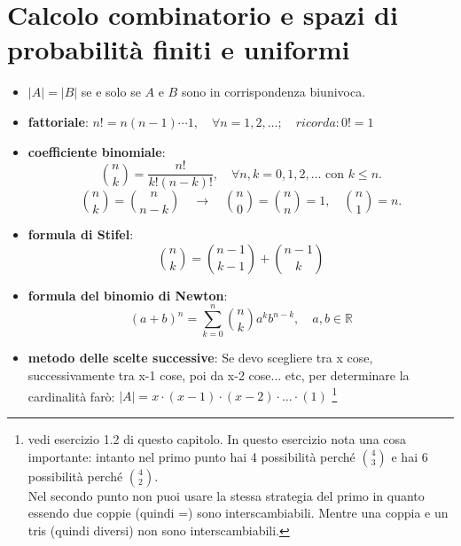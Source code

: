 \documentclass[12pt]{extarticle} %
\begin{document}
\section{Calcolo combinatorio e spazi di probabilità finiti e uniformi}
\begin{itemize}
    \item $|A| = |B|$ se e solo se $A$ e $B$ sono in corrispondenza biunivoca.
    \item \textbf{fattoriale}: $ n! = n(n-1)\cdots 1, \quad \forall n=1,2,\dots; \quad ricorda:  0! = 1 $
    
    \item \textbf{coefficiente binomiale}:
    $$ \binom{n}{k} = \frac{n!}{k!(n-k)!}, \quad \forall n,k = 0,1,2,\dots \text{ con } k \le n. $$
    $$ \binom{n}{k} = \binom{n}{n-k} \quad \to \quad \binom{n}{0} = \binom{n}{n} = 1, \quad \binom{n}{1} = n. $$
    
    \item \textbf{formula di Stifel}:
    $$ \binom{n}{k} = \binom{n-1}{k-1} + \binom{n-1}{k} $$

    \item \textbf{formula del binomio di Newton}:
    $$ (a+b)^n = \sum_{k=0}^{n} \binom{n}{k} a^k b^{n-k}, \quad a,b \in \mathbb{R} $$

    \vspace{0.3cm}

    \item \textbf{metodo delle scelte successive}: Se devo scegliere tra x cose, successivamente tra x-1 cose, poi da x-2 cose... etc, per determinare la cardinalità farò: $|A| = x \cdot (x-1)  \cdot (x-2) \cdot \dots \cdot (1)$   \footnote{vedi esercizio 1.2 di questo capitolo. In questo esercizio nota una cosa importante: intanto nel primo punto hai 4 possibilità perché $\binom{4}{3}$ e hai 6 possibilità perché $\binom{4}{2}.$\\ Nel secondo punto non puoi usare la stessa strategia del primo in quanto essendo due coppie (quindi =) sono interscambiabili. Mentre una coppia e un tris (quindi diversi) non sono interscambiabili.}

    \vspace{0.3cm}
\end{itemize}
\end{document}

